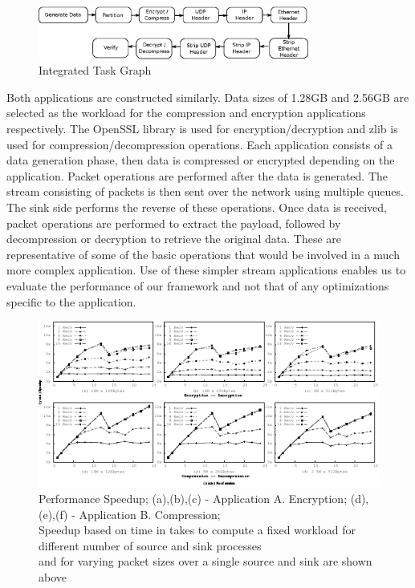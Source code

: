 \documentclass[10pt, conference, compsocconf, reqno]{IEEEtran}
\newcommand{\comment}[1]{}
\begin{document}
\begin{figure}[htb]
\centering
\includegraphics[width=3.5in]{enc-dec}
\caption{ Integrated Task Graph  }
\label{fig-app-graph}
\end{figure}

Both applications are constructed similarly. Data sizes of 1.28GB and 2.56GB are selected as the workload for the compression and encryption applications respectively. The OpenSSL library is used for encryption/decryption and zlib is used for compression/decompression operations. Each application consists of a data generation phase, then data is compressed or encrypted depending on the application. Packet operations are performed after the data is generated. The stream consisting of packets is then sent over the network using multiple queues. The sink side performs the reverse of these operations. Once data is received, packet operations are performed to extract the payload, followed by decompression or decryption to retrieve the original data. These are representative of some of the basic operations that would be involved in a much more complex application. \comment{Choosing to compare these simple operations avoids any extraneous factors that may be present in a more complex application.}Use of these simpler stream applications enables us to evaluate the performance of our framework and not that of any optimizations specific to the application.

\begin{figure}[tb]
\centering
\includegraphics[width=7in]{result}
\caption{Performance Speedup; (a),(b),(c) - Application A. Encryption; (d),(e),(f) - Application B. Compression;\\ \newline Speedup based on time in takes to compute a fixed workload for different number of source and sink processes\\ \newline and for varying packet sizes over a single source and sink are shown above}
\label{fig-res}
\end{figure}
\end{document}
